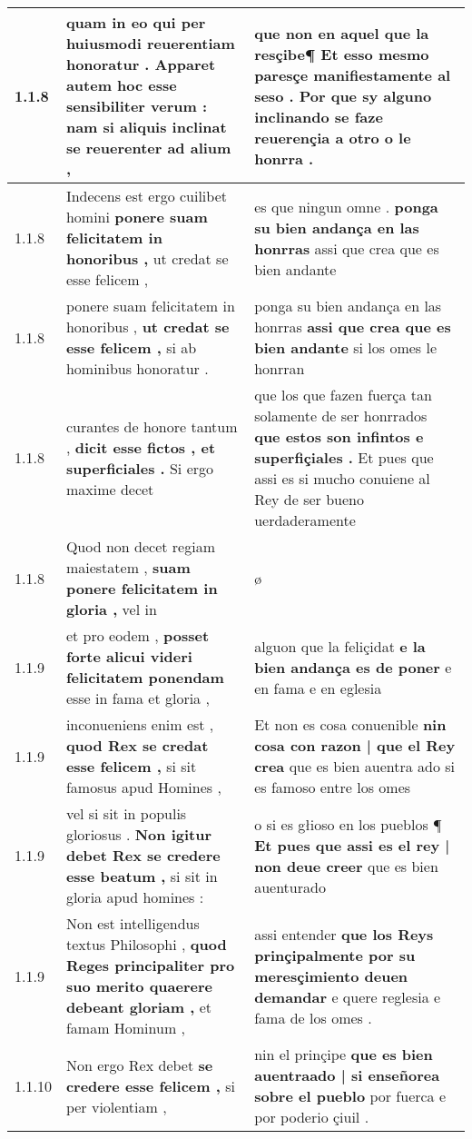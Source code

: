 \begin{tabular}{|p{1cm}|p{6.5cm}|p{6.5cm}|}
1.1.8 & quam in eo qui per huiusmodi reuerentiam honoratur . \textbf{ Apparet autem hoc esse sensibiliter verum : } nam si aliquis inclinat se reuerenter ad alium , & que non en aquel que la resçibe¶ \textbf{ Et esso mesmo paresçe manifiestamente al seso . } Por que sy alguno inclinando se faze reuerençia a otro o le honrra . \\\hline
1.1.8 & Indecens est ergo cuilibet homini \textbf{ ponere suam felicitatem in honoribus , } ut credat se esse felicem , & es que ningun omne . \textbf{ ponga su bien andança en las honrras } assi que crea que es bien andante \\\hline
1.1.8 & ponere suam felicitatem in honoribus , \textbf{ ut credat se esse felicem , } si ab hominibus honoratur . & ponga su bien andança en las honrras \textbf{ assi que crea que es bien andante } si los omes le honrran \\\hline
1.1.8 & curantes de honore tantum , \textbf{ dicit esse fictos , et superficiales . } Si ergo maxime decet & que los que fazen fuerça tan solamente de ser honrrados \textbf{ que estos son infintos e superfiçiales . } Et pues que assi es si mucho conuiene al Rey de ser bueno uerdaderamente \\\hline
1.1.8 & Quod non decet regiam maiestatem , \textbf{ suam ponere felicitatem in gloria , } vel in & ø \\\hline
1.1.9 & et pro eodem , \textbf{ posset forte alicui videri felicitatem ponendam } esse in fama et gloria , & alguon que la feliçidat \textbf{ e la bien andança es de poner } e en fama e en eglesia \\\hline
1.1.9 & inconueniens enim est , \textbf{ quod Rex se credat esse felicem , } si sit famosus apud Homines , & Et non es cosa conuenible \textbf{ nin cosa con razon | que el Rey crea } que es bien auentra ado si es famoso entre los omes \\\hline
1.1.9 & vel si sit in populis gloriosus . \textbf{ Non igitur debet Rex se credere esse beatum , } si sit in gloria apud homines : & o si es głioso en los pueblos ¶ \textbf{ Et pues que assi es el rey | non deue creer } que es bien auenturado \\\hline
1.1.9 & Non est intelligendus textus Philosophi , \textbf{ quod Reges principaliter pro suo merito quaerere debeant gloriam , } et famam Hominum , & assi entender \textbf{ que los Reys prinçipalmente por su meresçimiento deuen demandar } e quere reglesia e fama de los omes . \\\hline
1.1.10 & Non ergo Rex debet \textbf{ se credere esse felicem , } si per violentiam , & nin el prinçipe \textbf{ que es bien auentraado | si enseñorea sobre el pueblo } por fuerca e por poderio çiuil . \\\hline

\end{tabular}
